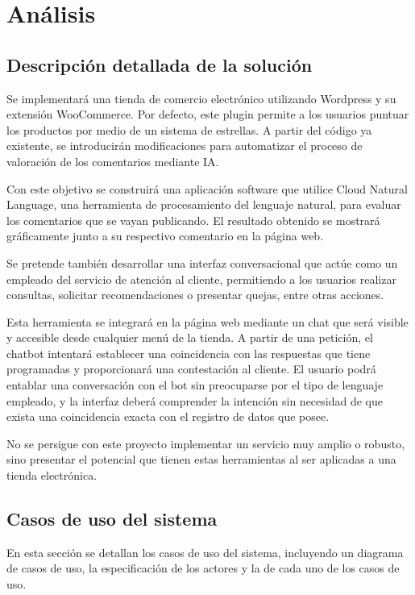 \chapter{Análisis} 
\label{sec:analisis}

\section{Descripción detallada de la solución}

Se implementará una tienda de comercio electrónico utilizando Wordpress y su extensión WooCommerce. Por defecto, este plugin permite a los usuarios puntuar los productos por medio de un sistema de estrellas. A partir del código ya existente, se introducirán modificaciones para automatizar el proceso de valoración de los comentarios mediante IA.

Con este objetivo se construirá una aplicación software que utilice Cloud Natural Language, una herramienta de procesamiento del lenguaje natural, para evaluar los comentarios que se vayan publicando. El resultado obtenido se mostrará gráficamente junto a su respectivo comentario en la página web.

Se pretende también desarrollar una interfaz conversacional que actúe como un empleado del servicio de atención al cliente, permitiendo a los usuarios realizar consultas, solicitar recomendaciones o presentar quejas, entre otras acciones. 

Esta herramienta se integrará en la página web mediante un chat que será visible y accesible desde cualquier menú de la tienda. A partir de una petición, el chatbot intentará establecer una coincidencia con las respuestas que tiene programadas y proporcionará una contestación al cliente. El usuario podrá entablar una conversación con el bot sin preocuparse por el tipo de lenguaje empleado, y la interfaz deberá comprender la intención sin necesidad de que exista una coincidencia exacta con el registro de datos que posee.

No se persigue con este proyecto implementar un servicio muy amplio o robusto, sino presentar el potencial que tienen estas herramientas al ser aplicadas a una tienda electrónica.

\newpage

\section{Casos de uso del sistema}

En esta sección se detallan los casos de uso del sistema, incluyendo un diagrama de casos de uso, la especificación de los actores y la de cada uno de los casos de uso.


